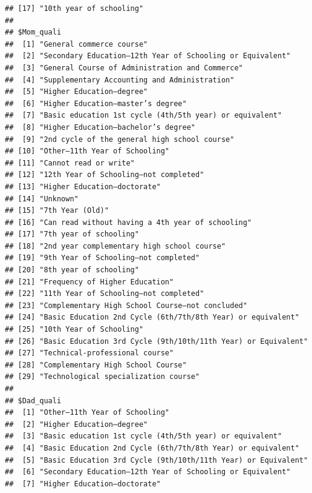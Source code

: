 \documentclass[
]{article}
\begin{document}
\begin{verbatim}
## [17] "10th year of schooling"                                      
## 
## $Mom_quali
##  [1] "General commerce course"                                     
##  [2] "Secondary Education—12th Year of Schooling or Equivalent"    
##  [3] "General Course of Administration and Commerce"               
##  [4] "Supplementary Accounting and Administration"                 
##  [5] "Higher Education—degree"                                     
##  [6] "Higher Education—master’s degree"                            
##  [7] "Basic education 1st cycle (4th/5th year) or equivalent"      
##  [8] "Higher Education—bachelor’s degree"                          
##  [9] "2nd cycle of the general high school course"                 
## [10] "Other—11th Year of Schooling"                                
## [11] "Cannot read or write"                                        
## [12] "12th Year of Schooling—not completed"                        
## [13] "Higher Education—doctorate"                                  
## [14] "Unknown"                                                     
## [15] "7th Year (Old)"                                              
## [16] "Can read without having a 4th year of schooling"             
## [17] "7th year of schooling"                                       
## [18] "2nd year complementary high school course"                   
## [19] "9th Year of Schooling—not completed"                         
## [20] "8th year of schooling"                                       
## [21] "Frequency of Higher Education"                               
## [22] "11th Year of Schooling—not completed"                        
## [23] "Complementary High School Course—not concluded"              
## [24] "Basic Education 2nd Cycle (6th/7th/8th Year) or equivalent"  
## [25] "10th Year of Schooling"                                      
## [26] "Basic Education 3rd Cycle (9th/10th/11th Year) or Equivalent"
## [27] "Technical-professional course"                               
## [28] "Complementary High School Course"                            
## [29] "Technological specialization course"                         
## 
## $Dad_quali
##  [1] "Other—11th Year of Schooling"                                
##  [2] "Higher Education—degree"                                     
##  [3] "Basic education 1st cycle (4th/5th year) or equivalent"      
##  [4] "Basic Education 2nd Cycle (6th/7th/8th Year) or equivalent"  
##  [5] "Basic Education 3rd Cycle (9th/10th/11th Year) or Equivalent"
##  [6] "Secondary Education—12th Year of Schooling or Equivalent"    
##  [7] "Higher Education—doctorate"                                  

\end{verbatim}
\end{document}

